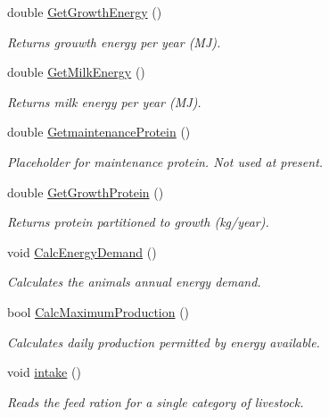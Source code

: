 \begin{DoxyCompactItemize}
double \mbox{\hyperlink{classlivestock_a4a18f5cfcedb2990257d0f50a0440bd8}{Get\+Growth\+Energy}} ()
\begin{DoxyCompactList}\small\item\em Returns grouwth energy per year (MJ). \end{DoxyCompactList}\item 
double \mbox{\hyperlink{classlivestock_a3769db690d5b53d96e92a5497b17bcd2}{Get\+Milk\+Energy}} ()
\begin{DoxyCompactList}\small\item\em Returns milk energy per year (MJ). \end{DoxyCompactList}\item 
\mbox{\label{classlivestock_ac5ae828f82a2dd6ec59eca8c6a56d774}} 
double \mbox{\hyperlink{classlivestock_ac5ae828f82a2dd6ec59eca8c6a56d774}{Getmaintenance\+Protein}} ()
\begin{DoxyCompactList}\small\item\em Placeholder for maintenance protein. Not used at present. \end{DoxyCompactList}\item 
double \mbox{\hyperlink{classlivestock_a041d8fd0f88b5c6c017135632867efc5}{Get\+Growth\+Protein}} ()
\begin{DoxyCompactList}\small\item\em Returns protein partitioned to growth (kg/year). \end{DoxyCompactList}\item 
\mbox{\label{classlivestock_a142934fcc1a5d7e48f4a6c0d0ade892d}} 
void \mbox{\hyperlink{classlivestock_a142934fcc1a5d7e48f4a6c0d0ade892d}{Calc\+Energy\+Demand}} ()
\begin{DoxyCompactList}\small\item\em Calculates the animal\textquotesingle{}s annual energy demand. \end{DoxyCompactList}\item 
bool \mbox{\hyperlink{classlivestock_a47d7963fe09dec2dcc05a671433e492a}{Calc\+Maximum\+Production}} ()
\begin{DoxyCompactList}\small\item\em Calculates daily production permitted by energy available. \end{DoxyCompactList}\item 
void \mbox{\hyperlink{classlivestock_ad338831b82101e04caa927a1e3c77d0b}{intake}} ()
\begin{DoxyCompactList}\small\item\em Reads the feed ration for a single category of livestock. \end{DoxyCompactList}\item 

\end{DoxyCompactItemize}
